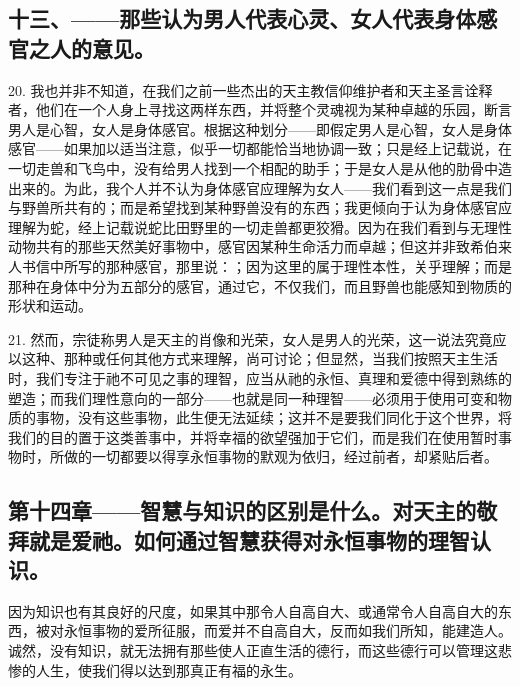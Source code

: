 
\subsection{十三、——那些认为男人代表心灵、女人代表身体感官之人的意见。}

20. 我也并非不知道，在我们之前一些杰出的天主教信仰维护者和天主圣言诠释者，他们在一个人身上寻找这两样东西，并将整个灵魂视为某种卓越的乐园，断言男人是心智，女人是身体感官。根据这种划分——即假定男人是心智，女人是身体感官——如果加以适当注意，似乎一切都能恰当地协调一致；只是经上记载说，在一切走兽和飞鸟中，没有给男人找到一个相配的助手；于是女人是从他的肋骨中造出来的。为此，我个人并不认为身体感官应理解为女人——我们看到这一点是我们与野兽所共有的；而是希望找到某种野兽没有的东西；我更倾向于认为身体感官应理解为蛇，经上记载说蛇比田野里的一切走兽都更狡猾。因为在我们看到与无理性动物共有的那些天然美好事物中，感官因某种生命活力而卓越；但这并非致希伯来人书信中所写的那种感官，那里说：；因为这里的属于理性本性，关乎理解；而是那种在身体中分为五部分的感官，通过它，不仅我们，而且野兽也能感知到物质的形状和运动。\par

21. 然而，宗徒称男人是天主的肖像和光荣，女人是男人的光荣，这一说法究竟应以这种、那种或任何其他方式来理解，尚可讨论；但显然，当我们按照天主生活时，我们专注于祂不可见之事的理智，应当从祂的永恒、真理和爱德中得到熟练的塑造；而我们理性意向的一部分——也就是同一种理智——必须用于使用可变和物质的事物，没有这些事物，此生便无法延续；这并不是要我们同化于这个世界，将我们的目的置于这类善事中，并将幸福的欲望强加于它们，而是我们在使用暂时事物时，所做的一切都要以得享永恒事物的默观为依归，经过前者，却紧贴后者。\par


\subsection{第十四章——智慧与知识的区别是什么。对天主的敬拜就是爱祂。如何通过智慧获得对永恒事物的理智认识。}

因为知识也有其良好的尺度，如果其中那令人自高自大、或通常令人自高自大的东西，被对永恒事物的爱所征服，而爱并不自高自大，反而如我们所知，能建造人。诚然，没有知识，就无法拥有那些使人正直生活的德行，而这些德行可以管理这悲惨的人生，使我们得以达到那真正有福的永生。\par

